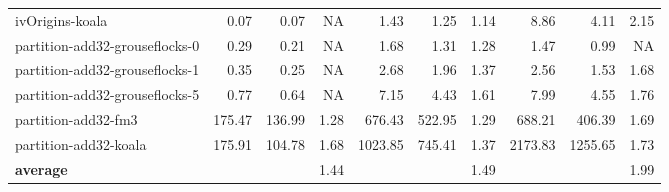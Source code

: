 \begin{tabular}{l|rrr|rrr|rrr}
                ivOrigins-koala &   0.07 &   0.07 &       NA &    1.43 &   1.25 &     1.14 &     8.86 &    4.11 &  2.15 \\
 partition-add32-grouseflocks-0 &   0.29 &   0.21 &       NA &    1.68 &   1.31 &     1.28 &     1.47 &    0.99 &    NA \\
 partition-add32-grouseflocks-1 &   0.35 &   0.25 &       NA &    2.68 &   1.96 &     1.37 &     2.56 &    1.53 &  1.68 \\
 partition-add32-grouseflocks-5 &   0.77 &   0.64 &       NA &    7.15 &   4.43 &     1.61 &     7.99 &    4.55 &  1.76 \\
            partition-add32-fm3 & 175.47 & 136.99 &     1.28 &  676.43 & 522.95 &     1.29 &   688.21 &  406.39 &  1.69 \\
          partition-add32-koala & 175.91 & 104.78 &     1.68 & 1023.85 & 745.41 &     1.37 &  2173.83 & 1255.65 &  1.73 \\
\midrule
\textbf{average} & & & 1.44 & & & 1.49 & & & 1.99 \\
\bottomrule
\end{tabular}
